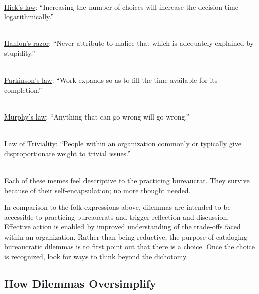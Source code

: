 \ \\
\href{https://en.wikipedia.org/wiki/Hick\%27s_law}{Hick's law}:
``Increasing the number of choices will increase the decision time logarithmically.''

\ \\
\href{https://en.wikipedia.org/wiki/Hanlon\%27s_razor}{Hanlon's razor}:
``Never attribute to malice that which is adequately explained by stupidity.''

\ \\
\href{https://en.wikipedia.org/wiki/Parkinson\%27s_law}{Parkinson's law}:
``Work expands so as to fill the time available for its completion.''

\ \\
\href{https://en.wikipedia.org/wiki/Murphy\%27s_law}{Murphy's law}:
``Anything that can go wrong will go wrong.''

\ \\
\href{https://en.wikipedia.org/wiki/Law_of_triviality}{Law of Triviality}:
``People within an organization commonly or typically give disproportionate weight to trivial issues.''

\ \\

Each of these memes feel descriptive to the practicing bureaucrat. They survive because of their self-encapsulation; no more thought needed.

In comparison to the folk expressions above, dilemmas are intended to be accessible to practicing bureaucrats and trigger reflection and discussion. Effective action is enabled by improved understanding of the trade-offs faced within an organization. Rather than being reductive, the purpose of cataloging bureaucratic dilemmas is to first point out that there is a choice. Once the choice is recognized, look for ways to think beyond the dichotomy.

\subsection*{How Dilemmas Oversimplify}

